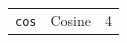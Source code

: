 \begin{table}
\begin{tabular}{clc}
\lstinline!cos!     & Cosine& 4\\                                                                                                                                                                                                                                                                                                                                                                                                                                                                                                                                                                                                                                                                                                                                                                                                                                                                                                                                                                                                                                                                                                                                                                                                                                                                                                                                                                                                                                                                                                                                                                                                                                                                                                                                                                                                                                                                                                                                                                                                                                                                                                                                                                                                                                                                                                                                                                                                                                                                                                                                                                                                                                                                                                                                                                                                                                                                                                                                                                                                                                                                                                                                                                                                                                                                                                                                    
\end{tabular}
\end{table}
